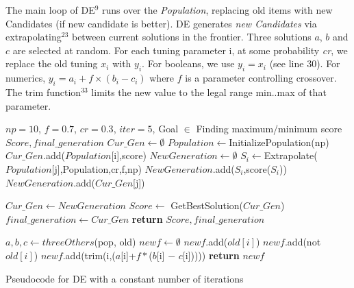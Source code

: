\documentclass[sigconf,review, anonymous]{acmart}
\renewcommand{\algorithmicrequire}{\textbf{Input:}}
\renewcommand{\algorithmicensure}{\textbf{Output:}}
\theoremstyle{break}
\begin{document}
The main loop of DE$^{9}$ runs over the \textit{Population}, replacing old items with new Candidates (if new candidate is better).
DE generates \textit{new Candidates} via 
extrapolating$^{23}$ between current solutions in the frontier. Three solutions $a$, $b$ and $c$ are
selected at random. For each tuning parameter i, at some probability \textit{cr}, we
replace the old tuning $x_i$ with $y_i$. For booleans, we use $y_i = x_i$ (see
line 30). For numerics, $y_i = a_i + f \times (b_i - c_i)$ where $f$ is a
parameter controlling crossover. The trim function$^{33}$ limits the new value
to the legal range min..max of that parameter.

\renewcommand{\algorithmicrequire}{\textbf{Input:}}
\renewcommand{\algorithmicensure}{\textbf{Output:}}
\begin{algorithm}
  
    \begin{algorithmic}[1]
    \Require $np=10$, $f=0.7$, $cr=0.3$, $iter=5$, Goal $\in$ Finding maximum/minimum score
    \Ensure $Score, final\_generation$
        \State  $Cur\_Gen \leftarrow \emptyset$
        \State $Population \leftarrow $InitializePopulation(np)
            \State $Cur\_Gen$.add($Population$[i],score)
        \EndFor
            \State $NewGeneration \leftarrow \emptyset$
                \State $S_i \leftarrow $Extrapolate($Population$[j],Population,cr,f,np)
                    \State $NewGeneration$.add($S_i$,score($S_i$))
                \Else
                    \State $NewGeneration$.add($Cur\_Gen$[j])
                \EndIf
            
            \EndFor
            \State  $Cur\_Gen \leftarrow NewGeneration$
        \EndFor
        \State $Score \leftarrow$ GetBestSolution($Cur\_Gen$)
        \State  $final\_generation \leftarrow Cur\_Gen$
        \State \textbf{return} $Score, final\_generation$
    \EndFunction

        \State $a,b,c \leftarrow threeOthers$(pop, old)
        \State $newf \leftarrow \emptyset$
                \State $newf$.add($old[i]$)
            \Else
                    \State $newf$.add(not $old[i]$)
                \Else 
                    \State $newf$.add(trim(i,($a$[i]+$f\ast$($b$[i] $-$ $c$[i]))))
                \EndIf
            \EndIf
        \EndFor
        \State \textbf{return} $newf$ 
    \EndFunction
    \caption{Pseudocode for DE with a constant number of iterations}
    \end{algorithmic}
\end{algorithm}
\end{document}
